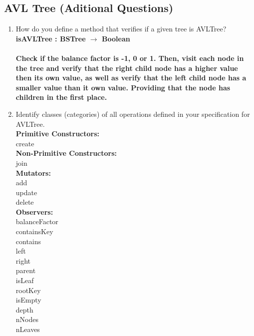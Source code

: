 \documentclass[12pt]{article}
\begin{document}
\begin{spacing}{1.5}
\section*{AVL Tree (Aditional Questions)}

\begin{enumerate}

\item How do you define a method that verifies if a given tree is AVLTree?\\
\textbf{isAVLTree : BSTree $\rightarrow$ Boolean} \\ \\
\textbf{Check if the balance factor is -1, 0 or 1. Then, visit each node in the tree and verify that the right child node has a higher value then its own value, as well as verify that the left child node has a smaller value than it own value. Providing that the node has children in the first place.}
  


\item Identify classes (categories) of all operations defined in your specification for AVLTree.\\
\textbf{Primitive Constructors:} \\
create\\
\textbf{Non-Primitive Constructors:} \\
join \\
\textbf{Mutators:} \\
add \\
update \\
delete \\
\textbf{Observers:} \\
balanceFactor \\
containsKey \\
contains\\
left\\
right\\
parent\\
isLeaf\\
rootKey\\
isEmpty\\
depth\\
nNodes\\
nLeaves\\


\end{enumerate}

\end{spacing}
\end{document}
